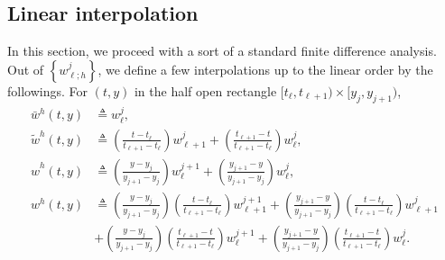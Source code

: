 \documentclass[a4paper,11pt]{article}
\theoremstyle{remark}
\begin{document}
\subsection{Linear interpolation}
In this section, we proceed with a sort of a standard finite difference analysis.
Out of $\left\{w^j_{\ell;h}\right\}$, we define a few interpolations up to the linear order by the followings. For $(t,y)$ in the half open rectangle $[t_\ell, t _{\ell+1}) \times [y_j, y _{j+1})$,
\begin{equation} \label{linear0}
\begin{aligned}
 \bar w^h(t,y)&\triangleq w^j_\ell,\\
 \tilde w^h(t,y)&\triangleq \left(\tfrac{t-t_\ell}{t_{\ell+1}-t_\ell} \right) w_{\ell+1}^{j} + \left(\tfrac{t_{\ell+1}-t}{t_{\ell+1}-t_\ell} \right) w_{\ell}^{j},\\
 \hat w^h(t,y)&\triangleq \left(\tfrac{y-y_j}{y_{j+1}-y_j} \right) w_{\ell}^{j+1} + \left(\tfrac{y_{j+1}-y}{y_{j+1}-y_j} \right) w_{\ell}^{j},\\
  w^h(t,y)&\triangleq \left(\tfrac{y-y_j}{y_{j+1}-y_j} \right)\left(\tfrac{t-t_\ell}{t_{\ell+1}-t_\ell} \right) w_{\ell+1}^{j+1} + \left(\tfrac{y_{j+1}-y}{y_{j+1}-y_j} \right)\left(\tfrac{t-t_\ell}{t_{\ell+1}-t_\ell} \right) w_{\ell+1}^{j}\\
 &+ \left(\tfrac{y-y_j}{y_{j+1}-y_j} \right)\left(\tfrac{t_{\ell+1}-t}{t_{\ell+1}-t_\ell} \right) w_{\ell}^{j+1} + \left(\tfrac{y_{j+1}-y}{y_{j+1}-y_j} \right)\left(\tfrac{t_{\ell+1}-t}{t_{\ell+1}-t_\ell} \right) w_{\ell}^{j}. 
  \end{aligned}
\end{equation}
% 
\end{document}
